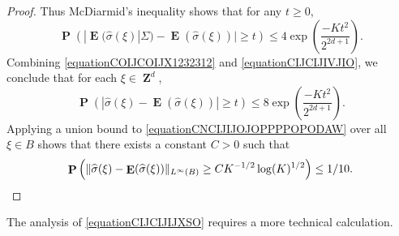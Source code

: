 \documentclass[dvipsnames,letterpaper,12pt]{article}
\numberwithin{equation}{section}
\DeclareMathOperator{\ZZ}{\mathbf{Z}}
\numberwithin{theorem}{section}
\DeclareMathOperator{\EE}{\mathbf{E}}
\DeclareMathOperator{\PP}{\mathbf{P}}
\begin{document}
\begin{proof}
    Thus McDiarmid's inequality shows that for any $t \geq 0$,
    \begin{equation} \label{equationCIJCIJIVJIO}
        \PP \left( |\EE(\widehat{\sigma}(\xi)|\Sigma) - \EE(\widehat{\sigma}(\xi))| \geq t \right) \leq 4 \exp \left( \frac{-K t^2}{2^{2d+1}} \right).
    \end{equation}
    Combining \eqref{equationCOIJCOIJX1232312} and \eqref{equationCIJCIJIVJIO}, we conclude that for each $\xi \in \ZZ^d$,
    \begin{equation} \label{equationCNCIJIJOJOPPPPOPODAW}
        \PP \left( | \widehat{\sigma}(\xi) - \EE(\widehat{\sigma}(\xi)) | \geq t  \right) \leq 8 \exp \left( \frac{-K t^2}{2^{2d + 1}} \right).
    \end{equation}
    Applying a union bound to \eqref{equationCNCIJIJOJOPPPPOPODAW} over all $\xi \in B$ shows that there exists a constant $C > 0$ such that
    \[ \PP \left( \| \widehat{\sigma}(\xi) - \EE(\widehat{\sigma}(\xi)) \|_{L^\infty(B)} \geq C K^{-1/2} \log(K)^{1/2} \right) \leq 1/10. \qedhere \]
\end{proof}

The analysis of \eqref{equationCIJCIJIJXSO} requires a more technical calculation.
\end{document}
